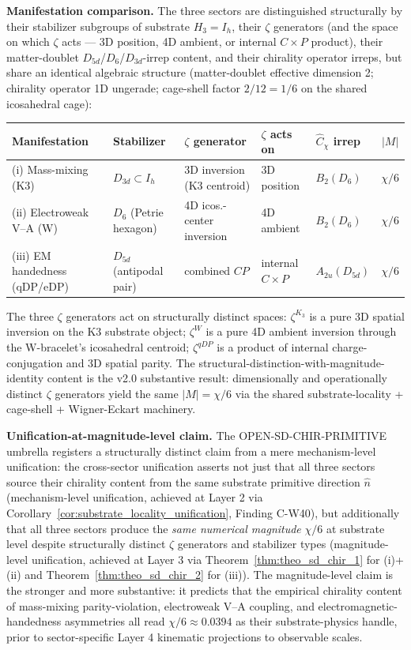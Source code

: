 \documentclass[11pt,letterpaper]{article}
\newcommand{\Kthree}{\ensuremath{K_3}}
\newcommand{\Dsix}{D_6}
\begin{document}
\textbf{Manifestation comparison.} The three sectors are distinguished structurally by their stabilizer subgroups of substrate $H_3 = I_h$, their $\zeta$ generators (and the space on which $\zeta$ acts --- 3D position, 4D ambient, or internal $C \times P$ product), their matter-doublet $D_{5d}$/$\Dsix$/$D_{3d}$-irrep content, and their chirality operator irreps, but share an identical algebraic structure (matter-doublet effective dimension 2; chirality operator 1D ungerade; cage-shell factor $2/12 = 1/6$ on the shared icosahedral cage):

\begin{center}
\begin{tabular}{p{3.9cm}p{2.3cm}p{2.6cm}p{2.2cm}p{1.3cm}c}
\toprule
Manifestation & Stabilizer & $\zeta$ generator & $\zeta$ acts on & $\hat{C}_\chi$ irrep & $|M|$ \\
\midrule
(i) Mass-mixing (K3) & $D_{3d} \subset I_h$ & 3D inversion (K3 centroid) & 3D position & $B_2(\Dsix)$ & $\chi/6$ \\
(ii) Electroweak V--A (W) & $\Dsix$ (Petrie hexagon) & 4D icos.-center inversion & 4D ambient & $B_2(\Dsix)$ & $\chi/6$ \\
(iii) EM handedness (qDP/eDP) & $D_{5d}$ (antipodal pair) & combined $CP$ & internal $C \times P$ & $A_{2u}(D_{5d})$ & $\chi/6$ \\
\bottomrule
\end{tabular}
\end{center}

The three $\zeta$ generators act on structurally distinct spaces: $\zeta^{\Kthree}$ is a pure 3D spatial inversion on the K3 substrate object; $\zeta^W$ is a pure 4D ambient inversion through the W-bracelet's icosahedral centroid; $\zeta^{qDP}$ is a product of internal charge-conjugation and 3D spatial parity. The structural-distinction-with-magnitude-identity content is the v2.0 substantive result: dimensionally and operationally distinct $\zeta$ generators yield the same $|M| = \chi/6$ via the shared substrate-locality + cage-shell + Wigner-Eckart machinery.

\textbf{Unification-at-magnitude-level claim.} The OPEN-SD-CHIR-PRIMITIVE umbrella registers a structurally distinct claim from a mere mechanism-level unification: the cross-sector unification asserts not just that all three sectors source their chirality content from the same substrate primitive direction $\hat{n}$ (mechanism-level unification, achieved at Layer 2 via Corollary~\ref{cor:substrate_locality_unification}, Finding C-W40), but additionally that all three sectors produce the \emph{same numerical magnitude} $\chi/6$ at substrate level despite structurally distinct $\zeta$ generators and stabilizer types (magnitude-level unification, achieved at Layer 3 via Theorem~\ref{thm:theo_sd_chir_1} for (i)+(ii) and Theorem~\ref{thm:theo_sd_chir_2} for (iii)). The magnitude-level claim is the stronger and more substantive: it predicts that the empirical chirality content of mass-mixing parity-violation, electroweak V--A coupling, and electromagnetic-handedness asymmetries all read $\chi/6 \approx 0.0394$ as their substrate-physics handle, prior to sector-specific Layer 4 kinematic projections to observable scales.
\end{document}
